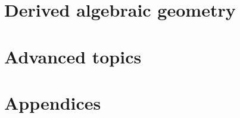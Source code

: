 \documentclass[a4paper]{memoir}
\theoremstyle{definition}
\theoremstyle{definition}
\theoremstyle{remark}
\begin{document}
\part{Derived algebraic geometry}





\part{Advanced topics}







\appendix

\part*{Appendices}


\end{document}
